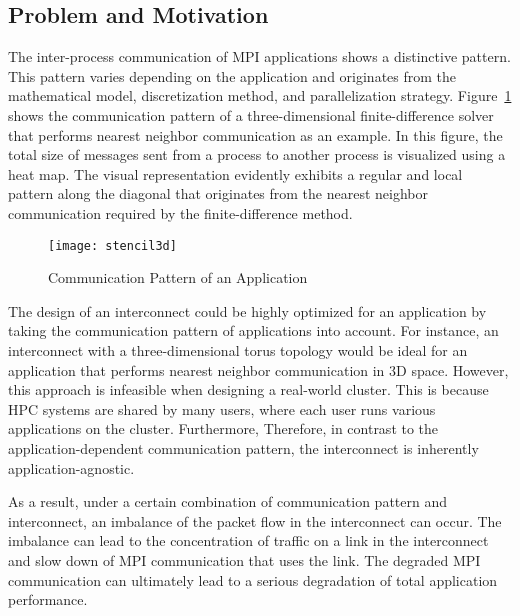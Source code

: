 \subsection{Problem and Motivation}

The inter-process communication of MPI applications shows a distinctive
pattern. This pattern varies depending on the application and originates from
the mathematical model, discretization method, and parallelization strategy.
Figure~\ref{fig:stencil3d} shows the communication pattern of a
three-dimensional finite-difference solver that performs nearest neighbor
communication as an example. In this figure, the total size of messages sent from
a process to another process is visualized using a heat map. The visual
representation evidently exhibits a regular and local pattern along the
diagonal that originates from the nearest neighbor communication required by
the finite-difference method.

\begin{figure}
    \centering
    \texttt{[image: stencil3d]}
    \caption{Communication Pattern of an Application}%
    \label{fig:stencil3d}
\end{figure}

The design of an interconnect could be highly optimized for an
application by taking the communication pattern of applications into account.
For instance, an interconnect with a three-dimensional torus topology would be
ideal for an application that performs nearest neighbor communication in 3D
space. However, this approach is infeasible when designing a real-world
cluster. This is because HPC systems are shared by many users, where each user
runs various applications on the cluster. Furthermore, Therefore, in contrast
to the application-dependent communication pattern, the interconnect is
inherently application-agnostic.

As a result, under a certain combination of communication pattern and
interconnect, an imbalance of the packet flow in the interconnect can occur.
The imbalance can lead to the concentration of traffic on a link in the
interconnect and slow down of MPI communication that uses the link. The
degraded MPI communication can ultimately lead to a serious degradation of
total application performance.

